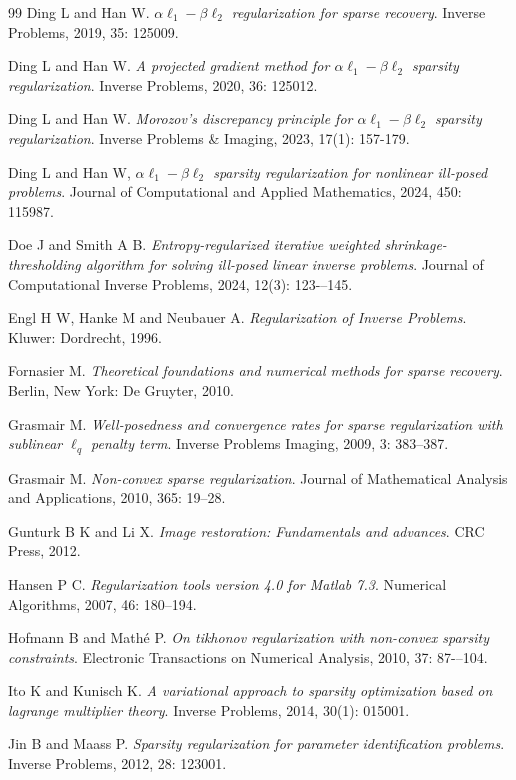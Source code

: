 \documentclass[a4paper,12pt]{article}
\numberwithin{equation}{section}
\begin{document}
\begin{thebibliography}{99}
Ding L and Han W. \emph{$\alpha\ell_{1}-\beta\ell_{2}$ regularization for sparse recovery}. Inverse Problems, 2019, 35: 125009.

Ding L and Han W. \emph{A projected gradient method for $\alpha\ell_{1}-\beta\ell_{2}$ sparsity regularization}. Inverse Problems, 2020, 36: 125012.

Ding L and Han W. \emph{Morozov's discrepancy principle for $\alpha\ell_{1}-\beta\ell_{2}$ sparsity regularization}. Inverse Problems \& Imaging, 2023, 17(1): 157-179.

Ding L and Han W, \emph{$\alpha\ell_{1}-\beta\ell_{2}$ sparsity regularization for nonlinear ill-posed problems}. Journal of Computational and Applied Mathematics, 2024, 450: 115987.

Doe J and Smith A B. \emph{Entropy-regularized iterative weighted shrinkage-thresholding algorithm for solving ill-posed linear inverse problems}. Journal of Computational Inverse Problems, 2024, 12(3): 123-–145.

Engl H W, Hanke M and Neubauer A. \emph{Regularization of Inverse Problems}. Kluwer: Dordrecht, 1996.

Fornasier M. \emph{Theoretical foundations and numerical methods for sparse recovery}. Berlin, New York: De Gruyter, 2010.

Grasmair M. \emph{Well-posedness and convergence rates for sparse regularization with sublinear $\ell_{q}$ penalty term}. Inverse Problems Imaging, 2009, 3: 383--387.

Grasmair M. \emph{Non-convex sparse regularization}. Journal of Mathematical Analysis and Applications, 2010, 365: 19--28.

Gunturk B K and Li X. \emph{Image restoration: Fundamentals and advances}. CRC Press, 2012.

Hansen P C. \emph{Regularization tools version 4.0 for Matlab 7.3}. Numerical Algorithms, 2007, 46: 180--194.

Hofmann B and Mathé P. \emph{On tikhonov regularization with non-convex sparsity constraints}. Electronic Transactions on Numerical Analysis, 2010, 37: 87-–104.

Ito K and Kunisch K. \emph{A variational approach to sparsity optimization based on lagrange multiplier theory}. Inverse Problems, 2014, 30(1): 015001.

Jin B and Maass P. \emph{Sparsity regularization for parameter identification problems}. Inverse Problems, 2012, 28: 123001.


\end{thebibliography}
\end{document}

